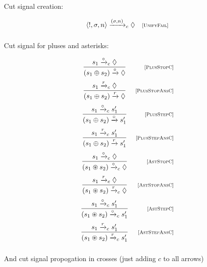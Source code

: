 Cut signal creation:

  \[
  \begin{array}{cr}
    \left<{!, \sigma, n}\right> \xrightarrow{(\sigma, n)}_c \Diamond &\mbox{\scriptsize{[\textsc{UnifyFail}]}} \\[2mm]
  \end{array}
\]

Cut signal for pluses and asterisks:

  \[
  \begin{array}{cr}
    \dfrac{s_1 \xrightarrow{\circ}_c \Diamond}{(s_1 \oplus s_2) \xrightarrow{\circ} \Diamond} & \mbox{\scriptsize{[\textsc{PlusStopC}]}}\\[5mm]
    \dfrac{s_1 \xrightarrow{r}_c \Diamond}{(s_1 \oplus s_2) \xrightarrow{r} \Diamond} & \mbox{\scriptsize{[\textsc{PlusStopAnsC}]}}\\[5mm]
    \dfrac{s_1 \xrightarrow{\circ}_c s'_1}{(s_1 \oplus s_2) \xrightarrow{\circ} s'_1} &\mbox{\scriptsize{[\textsc{PlusStepC}]}}\\[5mm]
    \dfrac{s_1 \xrightarrow{r}_c s'_1}{(s_1 \oplus s_2) \xrightarrow{r} s'_1} &\mbox{\scriptsize{[\textsc{PlusStepAnsC}]}}\\[5mm]
    \dfrac{s_1 \xrightarrow{\circ}_c \Diamond}{(s_1 \circledast s_2) \xrightarrow{\circ}_c \Diamond} & \mbox{\scriptsize{[\textsc{AstStopC}]}}\\[5mm]
    \dfrac{s_1 \xrightarrow{r}_c \Diamond}{(s_1 \circledast s_2) \xrightarrow{r}_c \Diamond} & \mbox{\scriptsize{[\textsc{AstStopAnsC}]}}\\[5mm]
    \dfrac{s_1 \xrightarrow{\circ}_c s'_1}{(s_1 \circledast s_2) \xrightarrow{\circ}_c s'_1} &\mbox{\scriptsize{[\textsc{AstStepC}]}}\\[5mm]
    \dfrac{s_1 \xrightarrow{r}_c s'_1}{(s_1 \circledast s_2) \xrightarrow{r}_c s'_1} &\mbox{\scriptsize{[\textsc{AstStepAnsC}]}}\\[5mm]
  \end{array}
  \]
  
And cut signal propogation in crosses (just adding $c$ to all arrows)
